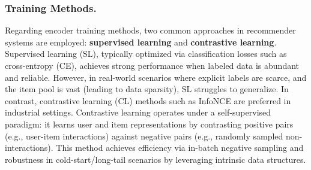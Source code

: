 \subsubsection{\textbf{Training Methods.}}
Regarding encoder training methods, two common approaches in recommender systems are employed: \textbf{supervised learning} and \textbf{contrastive learning}. 
Supervised learning (SL), typically optimized via classification losses such as cross-entropy (CE), achieves strong performance when labeled data is abundant and reliable.
However, in real-world scenarios where explicit labels are scarce, and the item pool is vast (leading to data sparsity), SL struggles to generalize. In contrast, contrastive learning (CL) methods such as InfoNCE are preferred in industrial settings.
Contrastive learning operates under a self-supervised paradigm: it learns user and item representations by contrasting positive pairs (e.g., user-item interactions) against negative pairs (e.g., randomly sampled non-interactions).
This method achieves efficiency via in-batch negative sampling and robustness in cold-start/long-tail scenarios by leveraging intrinsic data structures.




